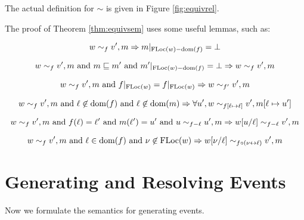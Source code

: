 \documentclass{article}
\begin{document}
The actual definition for $\sim$ is given in Figure \ref{fig:equivrel}.

The proof of Theorem \ref{thm:equivsem} uses some useful lemmas, such as:
\begin{lem}
  \[w\sim_f v',m\Rightarrow m|_{\text{FLoc}(w)-\text{dom}(f)}=\bot\]
\end{lem}

\begin{lem}
  \[w\sim_f v',m\text{ and }m\sqsubseteq m'\text{ and }m'|_{\text{FLoc}(w)-\text{dom}(f)}=\bot\Rightarrow w\sim_f v',m\]
\end{lem}

\begin{lem}
  \[w\sim_f v',m\text{ and }f|_{\text{FLoc}(w)}=f|_{\text{FLoc}(w)}\Rightarrow w\sim_{f'}v',m\]
\end{lem}

\begin{lem}
  \[w\sim_f v',m\text{ and }\ell\not\in\text{dom}(f)\text{ and }\ell\not\in\text{dom}(m)\Rightarrow\forall u',w\sim_{f[\ell\mapsto\ell]}v',m[\ell\mapsto u']\]
\end{lem}

\begin{lem}
  \[w\sim_f v',m\text{ and }f(\ell)=\ell'\text{ and }m(\ell')=u'\text{ and }u\sim_{f-\ell}u',m\Rightarrow w[u/\ell]\sim_{f-\ell}v',m\]
\end{lem}

\begin{lem}
  \[w\sim_f v',m\text{ and }\ell\in\text{dom}(f)\text{ and }\nu\not\in\text{FLoc}(w)\Rightarrow w[\nu/\ell]\sim_{f\circ(\nu\leftrightarrow\ell)}v',m\]
\end{lem}

\section{Generating and Resolving Events}
Now we formulate the semantics for generating events.
\end{document}
